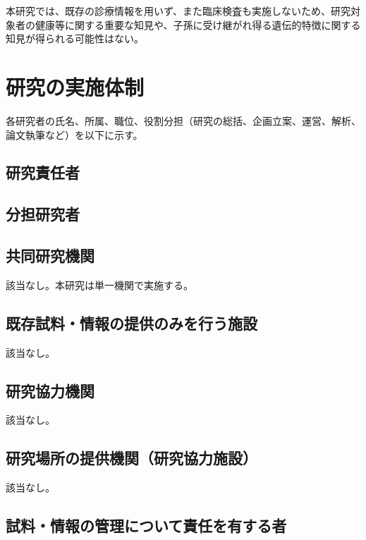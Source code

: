 \documentclass{kyodai-protocol}
\begin{document}
本研究では、既存の診療情報を用いず、また臨床検査も実施しないため、研究対象者の健康等に関する重要な知見や、子孫に受け継がれ得る遺伝的特徴に関する知見が得られる可能性はない。

\section{研究の実施体制}
\label{sec:organization}

各研究者の氏名、所属、職位、役割分担（研究の総括、企画立案、運営、解析、論文執筆など）を以下に示す。

\subsection{研究責任者}


\subsection{分担研究者}


\subsection{共同研究機関}

該当なし。本研究は単一機関で実施する。

\subsection{既存試料・情報の提供のみを行う施設}

該当なし。

\subsection{研究協力機関}

該当なし。

\subsection{研究場所の提供機関（研究協力施設）}

該当なし。

\subsection{試料・情報の管理について責任を有する者}
\end{document}

